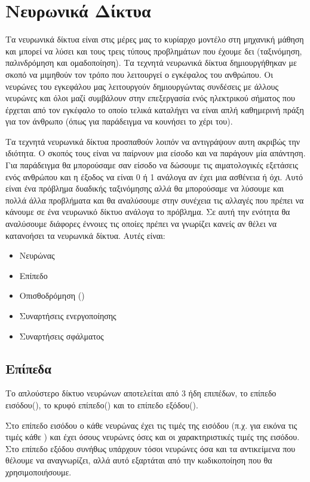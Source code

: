 \newpage
\section{Νευρωνικά Δίκτυα}
Τα νευρωνικά δίκτυα είναι στις μέρες μας το κυρίαρχο μοντέλο στη μηχανική μάθηση και μπορεί να λύσει και τους τρεις τύπους προβλημάτων που έχουμε δει (ταξινόμηση, παλινδρόμηση και ομαδοποίηση). Τα τεχνητά νευρωνικά δίκτυα δημιουργήθηκαν με
σκοπό να μιμηθούν τον τρόπο που λειτουργεί ο εγκέφαλος του ανθρώπου. Οι νευρώνες του εγκεφάλου μας λειτουργούν δημιουργώντας συνδέσεις με άλλους νευρώνες και όλοι μαζί συμβάλουν στην επεξεργασία ενός ηλεκτρικού σήματος που έρχεται από τον
εγκέφαλο το οποίο τελικά καταλήγει να είναι απλή καθημερινή πράξη για τον άνθρωπο (όπως για παράδειγμα να κουνήσει το χέρι του)\cite{nnip}.

Τα τεχνητά νευρωνικά δίκτυα προσπαθούν λοιπόν να αντιγράψουν αυτη ακριβώς την ιδιότητα. Ο σκοπός τους είναι να παίρνουν μια είσοδο και να παράγουν μία απάντηση. Για παράδειγμα θα μπορούσαμε σαν είσοδο να δώσουμε τις αιματολογικές εξετάσεις
ενός ανθρώπου και η έξοδος να είναι 0 ή 1 ανάλογα αν έχει μια ασθένεια ή όχι. Αυτό είναι ένα πρόβλημα δυαδικής ταξινόμησης αλλά θα μπορούσαμε να λύσουμε και πολλά άλλα προβλήματα και θα αναλύσουμε στην συνέχεια τις αλλαγές που πρέπει να
κάνουμε σε ένα νευρωνικό δίκτυο ανάλογα το πρόβλημα. Σε αυτή την ενότητα θα αναλύσουμε διάφορες έννοιες τις οποίες πρέπει να γνωρίζει κανείς αν θέλει να κατανοήσει τα νευρωνικά δίκτυα. Αυτές είναι\cite{nnav}:
\begin{itemize}
    \item Νευρώνας
    \item Επίπεδο
    \item Οπισθοδρόμηση ()
    \item Συναρτήσεις ενεργοποίησης
    \item Συναρτήσεις σφάλματος
\end{itemize}
\subsection{Επίπεδα}
Το απλούστερο δίκτυο νευρώνων αποτελείται από 3 ήδη επιπέδων, το επίπεδο εισόδου(),
το κρυφό επίπεδο() και το επίπεδο εξόδου().


Στο επίπεδο εισόδου ο κάθε νευρώνας έχει τις τιμές της εισόδου (π.χ. για εικόνα τις  τιμές
κάθε ) και έχει όσους νευρώνες όσες και οι χαρακτηριστικές τιμές της εισόδου. Στο
επίπεδο εξόδου συνήθως υπάρχουν τόσοι νευρώνες όσα και τα αντικείμενα που θέλουμε να
αναγνωρίζει, αλλά αυτό εξαρτάται από την κωδικοποίηση που θα χρησιμοποιήσουμε.

